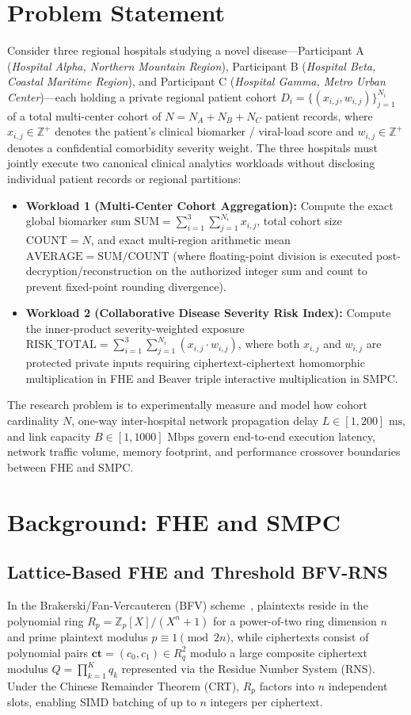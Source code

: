 \documentclass[conference]{IEEEtran}
\begin{document}
\section{Problem Statement}
Consider three regional hospitals studying a novel disease---Participant A (\emph{Hospital Alpha, Northern Mountain Region}), Participant B (\emph{Hospital Beta, Coastal Maritime Region}), and Participant C (\emph{Hospital Gamma, Metro Urban Center})---each holding a private regional patient cohort $D_i = \{(x_{i,j}, w_{i,j})\}_{j=1}^{N_i}$ of a total multi-center cohort of $N = N_A + N_B + N_C$ patient records, where $x_{i,j} \in \mathbb{Z}^+$ denotes the patient's clinical biomarker / viral-load score and $w_{i,j} \in \mathbb{Z}^+$ denotes a confidential comorbidity severity weight. The three hospitals must jointly execute two canonical clinical analytics workloads without disclosing individual patient records or regional partitions:
\begin{itemize}
    \item \textbf{Workload 1 (Multi-Center Cohort Aggregation):} Compute the exact global biomarker sum $\text{SUM} = \sum_{i=1}^3 \sum_{j=1}^{N_i} x_{i,j}$, total cohort size $\text{COUNT} = N$, and exact multi-region arithmetic mean $\text{AVERAGE} = \text{SUM} / \text{COUNT}$ (where floating-point division is executed post-decryption/reconstruction on the authorized integer sum and count to prevent fixed-point rounding divergence).
    \item \textbf{Workload 2 (Collaborative Disease Severity Risk Index):} Compute the inner-product severity-weighted exposure $\text{RISK\_TOTAL} = \sum_{i=1}^3 \sum_{j=1}^{N_i} (x_{i,j} \cdot w_{i,j})$, where both $x_{i,j}$ and $w_{i,j}$ are protected private inputs requiring ciphertext-ciphertext homomorphic multiplication in FHE and Beaver triple interactive multiplication in SMPC.
\end{itemize}
The research problem is to experimentally measure and model how cohort cardinality $N$, one-way inter-hospital network propagation delay $L \in [1, 200]\text{ ms}$, and link capacity $B \in [1, 1000]\text{ Mbps}$ govern end-to-end execution latency, network traffic volume, memory footprint, and performance crossover boundaries between FHE and SMPC.

\section{Background: FHE and SMPC}
\subsection{Lattice-Based FHE and Threshold BFV-RNS}
In the Brakerski/Fan-Vercauteren (BFV) scheme~\cite{bfv2012}, plaintexts reside in the polynomial ring $R_p = \mathbb{Z}_p[X]/(X^n+1)$ for a power-of-two ring dimension $n$ and prime plaintext modulus $p \equiv 1 \pmod{2n}$, while ciphertexts consist of polynomial pairs $\mathbf{ct} = (c_0, c_1) \in R_q^2$ modulo a large composite ciphertext modulus $Q = \prod_{k=1}^K q_k$ represented via the Residue Number System (RNS). Under the Chinese Remainder Theorem (CRT), $R_p$ factors into $n$ independent slots, enabling SIMD batching of up to $n$ integers per ciphertext.
\end{document}
